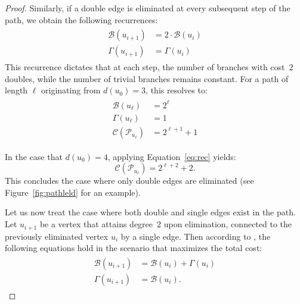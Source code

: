 \documentclass{article}
\begin{document}
\begin{proof}
            Similarly, if a double edge is eliminated at every subsequent step of the path, we obtain the following recurrences:
            \begin{align}\label{eq:rec}
                \begin{split}
                    \mathcal{B}(u_{i+1})&=2\cdot \mathcal{B}(u_{i})\\
                    \Gamma(u_{i+1})&=\Gamma(u_{i})
                \end{split}
            \end{align}
            This recurrence dictates that at each step, the number of branches with cost~$2$ doubles, while the number of trivial branches remains constant. For a path of length $\ell$ originating from $d(u_0)=3$, this resolves to:
            \begin{align}\label{eq:cost_path}
                \begin{split}
                \mathcal{B}(u_{\ell}) &= 2^\ell\\
                \Gamma(u_{\ell}) &= 1\\
                \mathcal{C}(\mathcal{P}_{u_{\ell}}) &= 2^{\ell+1}+1
                \end{split}
            \end{align}
            
            In the case that $d(u_0)=4$, applying Equation~\eqref{eq:rec} yields:
            \begin{equation}\label{eq:cost_path4}
                \mathcal{C}(\mathcal{P}_{u_{\ell}})=2^{\ell+2}+2.
            \end{equation} 
            This concludes the case where only double edges are eliminated (see Figure~\ref{fig:pathleld} for an example).
            
            Let us now treat the case where both double and single edges exist in the path.
            Let $u_{i+1}$ be a vertex that attains degree~$2$ upon elimination, connected to the previously eliminated vertex $u_i$ by a single edge.
            Then according to \cite{bet}, the following equations hold in the scenario that maximizes the total cost:
            \begin{align}\label{eq:rec2}
                \begin{split}
                    \mathcal{B}(u_{i+1})&=  \mathcal{B}(u_{i}) + \Gamma(u_i)\\
                    \Gamma(u_{i+1})&= \mathcal{B}(u_{i}).
                \end{split}
            \end{align}
            

\end{proof}
\end{document}
